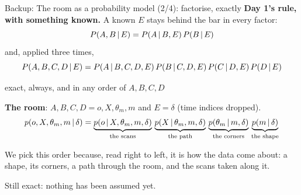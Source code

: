 \documentclass[10pt, aspectratio=169]{beamer}
\begin{document}
\begin{frame}{Backup: The room as a probability model (2/4): factorise, exactly}
  \setlength{\abovedisplayskip}{2pt}\setlength{\belowdisplayskip}{4pt}
  \small
  \textbf{Day 1's rule, with something known.} A known $E$ stays behind the bar in every factor:
  \[
    P(A,B\,|\, E) = P(A\,|\, B,E)\,P(B\,|\, E)
  \]
  and, applied three times,
  \[
    P(A,B,C,D\,|\, E) = P(A\,|\, B,C,D,E)\,P(B\,|\, C,D,E)\,P(C\,|\, D,E)\,P(D\,|\, E)
  \]
  {\centering\footnotesize\color{muted} exact, always, and in any order of $A,B,C,D$\par}
  \vspace{0.6em}
  \textbf{The room}: $A,B,C,D = o, X, \theta_m, m$ and $E=\delta$ (time indices dropped).
  \[
    p(o,X,\theta_m,m\,|\,\delta) =
    \underbrace{p(o\,|\, X,\theta_m,m,\delta)}_{\text{the scans}}\,
    \underbrace{p(X\,|\, \theta_m,m,\delta)}_{\text{the path}}\,
    \underbrace{p(\theta_m\,|\, m,\delta)}_{\text{the corners}}\,
    \underbrace{p(m\,|\, \delta)}_{\text{the shape}}
  \]
  {\centering\footnotesize We pick this order because, read right to left, it is how the data come about:
  a shape, its corners, a path through the room, and the scans taken along it.\par}
  \vspace{0.3em}
  {\centering\alert{Still exact: nothing has been assumed yet.}\par}
\end{frame}
\end{document}
